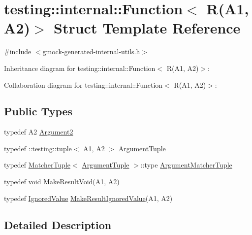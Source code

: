 \hypertarget{structtesting_1_1internal_1_1_function_3_01_r_07_a1_00_01_a2_08_4}{}\section{testing\+:\+:internal\+:\+:Function$<$ R(A1, A2)$>$ Struct Template Reference}
\label{structtesting_1_1internal_1_1_function_3_01_r_07_a1_00_01_a2_08_4}


{\ttfamily \#include $<$gmock-\/generated-\/internal-\/utils.\+h$>$}



Inheritance diagram for testing\+:\+:internal\+:\+:Function$<$ R(A1, A2)$>$\+:


Collaboration diagram for testing\+:\+:internal\+:\+:Function$<$ R(A1, A2)$>$\+:
\subsection*{Public Types}
\begin{DoxyCompactItemize}
\item 
typedef A2 \hyperlink{structtesting_1_1internal_1_1_function_3_01_r_07_a1_00_01_a2_08_4_a025f5192252366d73aa19718bb0ea89d}{Argument2}
\item 
typedef \+::testing\+::tuple$<$ A1, A2 $>$ \hyperlink{structtesting_1_1internal_1_1_function_3_01_r_07_a1_00_01_a2_08_4_a2de00437877c29ec6cb78396928b8e3e}{Argument\+Tuple}
\item 
typedef \hyperlink{structtesting_1_1internal_1_1_matcher_tuple}{Matcher\+Tuple}$<$ \hyperlink{structtesting_1_1internal_1_1_function_3_01_r_07_08_4_ad483c3128c470d8cdb55c3ac1c575c11}{Argument\+Tuple} $>$\+::type \hyperlink{structtesting_1_1internal_1_1_function_3_01_r_07_a1_00_01_a2_08_4_ad07042129ff6370f55a279ad12f5e80f}{Argument\+Matcher\+Tuple}
\item 
typedef void \hyperlink{structtesting_1_1internal_1_1_function_3_01_r_07_a1_00_01_a2_08_4_ada1ad22fa21c84ec3faea47ed20c1b46}{Make\+Result\+Void}(A1, A2)
\item 
typedef \hyperlink{classtesting_1_1internal_1_1_ignored_value}{Ignored\+Value} \hyperlink{structtesting_1_1internal_1_1_function_3_01_r_07_a1_00_01_a2_08_4_a89033ea870fe831b13899ce36666e102}{Make\+Result\+Ignored\+Value}(A1, A2)
\end{DoxyCompactItemize}


\subsection{Detailed Description}
